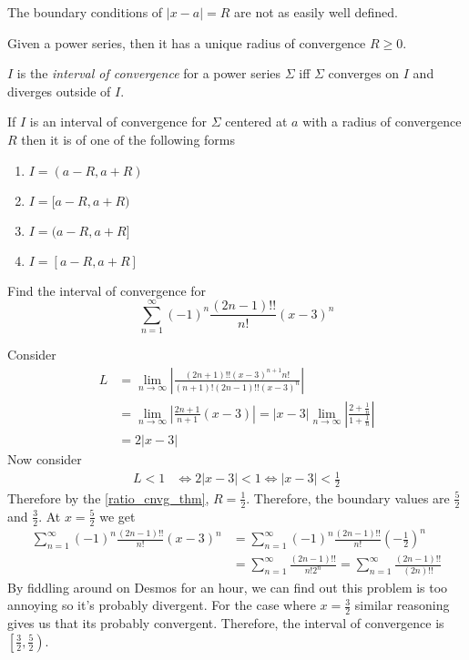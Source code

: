 \documentclass[notes]{subfiles}
\begin{document}
The boundary conditions of $|x - a| = R$ are not as easily well defined.

\begin{theorem}
    Given a power series, then it has a unique radius of convergence $R \geq 0$.
\end{theorem}

\begin{definition}
    $I$ is the \textsl{interval of convergence} for a power series $\Sigma$ iff $\Sigma$ converges on $I$ and diverges outside of $I$.
\end{definition}

\begin{lemma}
    If $I$ is an interval of convergence for $\Sigma$ centered at $a$ with a radius of convergence $R$ then it is of one of the following forms
    \begin{enumerate}[label = (\arabic*)]
        \item $I = (a - R, a + R)$
        \item $I = [a - R, a + R)$
        \item $I = (a - R, a + R]$
        \item $I = [a - R, a + R]$
    \end{enumerate}
\end{lemma}

\begin{exercise}
    Find the interval of convergence for
    \[
        \sum_{n = 1}^\infty (-1)^n \frac{(2n - 1)!!}{n!}(x - 3)^n
    \]
\end{exercise}
\begin{solution}
    Consider
    \begin{align*}
        L
        &= \lim_{n\to\infty} \left| \frac{(2n + 1)!! (x - 3)^{n + 1} n!}{(n + 1)! (2n - 1)!! (x - 3)^n} \right| \\
        &= \lim_{n\to\infty} \left| \frac{2n + 1}{n + 1} (x - 3) \right|
        = |x - 3| \lim_{n\to\infty} \left| \frac{2 + \frac{1}{n}}{1 + \frac{1}{n}} \right| \\
        &= 2|x - 3|
    \end{align*}
    Now consider
    \begin{align*}
        L < 1
        &\iff 2|x - 3| < 1
        \iff |x - 3| < \frac{1}{2}
    \end{align*}
    Therefore by the \cref{ratio_cnvg_thm}, $R = \frac{1}{2}$. Therefore, the boundary values are $\frac{5}{2}$ and $\frac{3}{2}$. At $x = \frac{5}{2}$ we get
    \begin{align*}
        \sum_{n = 1}^\infty (-1)^n \frac{(2n - 1)!!}{n!}(x - 3)^n
        &= \sum_{n = 1}^\infty (-1)^n \frac{(2n - 1)!!}{n!}\left(-\frac{1}{2}\right)^n \\
        &= \sum_{n = 1}^\infty \frac{(2n - 1)!!}{n! 2^n}
        = \sum_{n = 1}^\infty \frac{(2n - 1)!!}{(2n)!!}
    \end{align*}
    By fiddling around on Desmos for an hour, we can find out this problem is too annoying so it's probably divergent. For the case where $x = \frac{3}{2}$ similar reasoning gives us that its probably convergent. Therefore, the interval of convergence is $\left[ \frac{3}{2}, \frac{5}{2} \right)$.
\end{solution}
\end{document}
